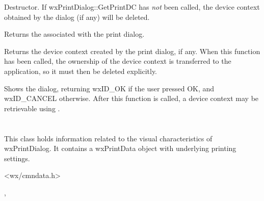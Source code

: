 
Destructor. If wxPrintDialog::GetPrintDC has {\it not} been called,
the device context obtained by the dialog (if any) will be deleted.


\label{wxprintdialoggetprintdialogdata}


Returns the  associated with the print dialog.


\label{wxprintdialoggetprintdc}


Returns the device context created by the print dialog, if any.
When this function has been called, the ownership of the device context
is transferred to the application, so it must then be deleted
explicitly.


\label{wxprintdialogshowmodal}


Shows the dialog, returning wxID\_OK if the user pressed OK, and wxID\_CANCEL
otherwise. After this function is called, a device context may
be retrievable using .

\section{}\label{wxprintdialogdata}

This class holds information related to the visual characteristics of wxPrintDialog.
It contains a wxPrintData object with underlying printing settings.




<wx/cmndata.h>


, 



\label{wxprintdialogdatactor}

